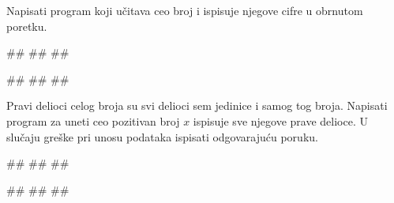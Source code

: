 \begin{Exercise}[label=v1.3_06] 
Napisati program koji učitava ceo broj i ispisuje njegove cifre u
obrnutom poretku. 

\begin{miditest}
\begin{upotreba}{1}
#\naslovInt#
##
##
\end{upotreba}
\end{miditest}
\begin{miditest}
\begin{upotreba}{2}
#\naslovInt#
##
##
\end{upotreba}
\end{miditest}
\end{Exercise}
\begin{Answer}[ref=v1.3_06]
\end{Answer}


\begin{Exercise}[label=v1.3_14] 
Pravi delioci celog broja su svi delioci sem jedinice i samog tog
broja.  Napisati program za uneti ceo pozitivan broj $x$
ispisuje sve njegove prave delioce. U slučaju greške pri unosu
podataka ispisati odgovarajuću poruku.  


\begin{miditest}
\begin{upotreba}{1}
#\naslovInt#
##
##
\end{upotreba}
\end{miditest}
\begin{miditest}
\begin{upotreba}{2}
#\naslovInt#
##
##
\end{upotreba}
\end{miditest}
\end{Exercise}
\begin{Answer}[ref=v1.3_14]
\end{Answer}


